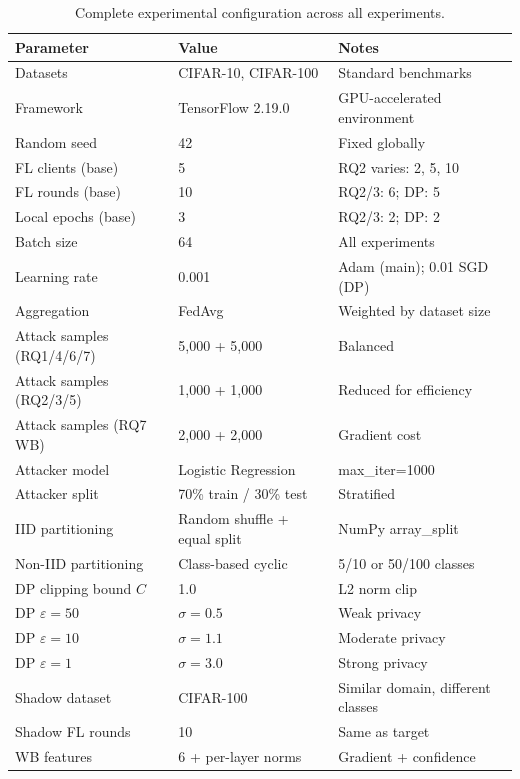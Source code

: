 \documentclass[12pt, a4paper]{report}
\begin{document}
\begin{table}[H]
  \centering
  \caption{Complete experimental configuration across all experiments.}
  \label{tab:config}
  \begin{tabular}{llp{5cm}}
    \toprule
    \textbf{Parameter} & \textbf{Value} & \textbf{Notes} \\
    \midrule
    Datasets                  & CIFAR-10, CIFAR-100   & Standard benchmarks \\
    Framework                 & TensorFlow 2.19.0     & GPU-accelerated environment \\
    Random seed               & 42                    & Fixed globally \\
    FL clients (base)         & 5                     & RQ2 varies: 2, 5, 10 \\
    FL rounds (base)          & 10                    & RQ2/3: 6; DP: 5 \\
    Local epochs (base)       & 3                     & RQ2/3: 2; DP: 2 \\
    Batch size                & 64                    & All experiments \\
    Learning rate             & 0.001                 & Adam (main); 0.01 SGD (DP) \\
    Aggregation               & FedAvg                & Weighted by dataset size \\
    Attack samples (RQ1/4/6/7) & 5,000 + 5,000        & Balanced \\
    Attack samples (RQ2/3/5)  & 1,000 + 1,000         & Reduced for efficiency \\
    Attack samples (RQ7 WB)   & 2,000 + 2,000         & Gradient cost \\
    Attacker model            & Logistic Regression   & max\_iter=1000 \\
    Attacker split            & 70\% train / 30\% test & Stratified \\
    IID partitioning          & Random shuffle + equal split & NumPy array\_split \\
    Non-IID partitioning      & Class-based cyclic    & 5/10 or 50/100 classes \\
    DP clipping bound $C$     & 1.0                   & L2 norm clip \\
    DP $\varepsilon=50$       & $\sigma = 0.5$        & Weak privacy \\
    DP $\varepsilon=10$       & $\sigma = 1.1$        & Moderate privacy \\
    DP $\varepsilon=1$        & $\sigma = 3.0$        & Strong privacy \\
    Shadow dataset            & CIFAR-100             & Similar domain, different classes \\
    Shadow FL rounds          & 10                    & Same as target \\
    WB features               & 6 + per-layer norms   & Gradient + confidence \\
    \bottomrule
  \end{tabular}
\end{table}
\end{document}

